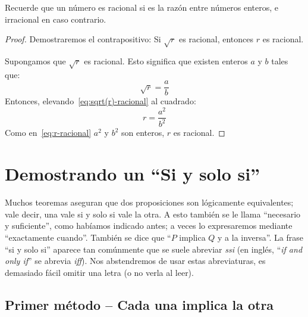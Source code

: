   Recuerde que un número es racional%
  si es la razón entre números enteros,
  e irracional en caso contrario.%
  \begin{proof}
    Demostraremos el contrapositivo:
    Si \(\sqrt{r}\) es racional,
    entonces \(r\) es racional.

    Supongamos que \(\sqrt{r}\) es racional.
    Esto significa que existen enteros \(a\) y \(b\) tales que:
    \begin{equation}
      \label{eq:sqrt(r)-racional}
      \sqrt{r} = \frac{a}{b}
    \end{equation}
    Entonces,
    elevando~\eqref{eq:sqrt(r)-racional} al cuadrado:
    \begin{equation}
      \label{eq:r-racional}
      r = \frac{a^2}{b^2}
    \end{equation}
    Como en~\eqref{eq:r-racional} \(a^2\) y \(b^2\) son enteros,
    \(r\) es racional.
  \end{proof}

\section{Demostrando un ``Si y solo si''}
\label{sec:ssi}

  Muchos teoremas aseguran
  que dos proposiciones son lógicamente equivalentes;
  vale decir,
  una vale si y solo si vale la otra.
  A esto también se le llama ``necesario y suficiente'',
  como habíamos indicado antes;
  a veces lo expresaremos mediante ``exactamente cuando''.
  También se dice que ``\(P\) implica \(Q\) y a la inversa''.
  La frase ``si y solo si'' aparece tan comúnmente
  que se suele abreviar \emph{ssi}
  (en inglés,
   ``\emph{\foreignlanguage{english}{if and only if}}''
  se abrevia \emph{\foreignlanguage{english}{iff}}).%
  Nos abstendremos de usar estas abreviaturas,
  es demasiado fácil omitir una letra
  (o no verla al leer).

\subsection{Primer método -- Cada una implica la otra}
\label{sec:equivalencias-1}

